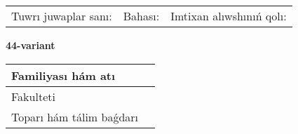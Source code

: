 \documentclass{article}
\begin{document}
\vspace{1cm}

\begin{tabular}{lll}
Tuwrı juwaplar sanı: \underline{\hspace{1.5cm}} & 
Bahası: \underline{\hspace{1.5cm}} & 
Imtixan alıwshınıń qolı: \underline{\hspace{2cm}} \\
\end{tabular}

\egroup

\newpage


\textbf{44-variant}\\

\bgroup
\def\arraystretch{1.6} %

\begin{tabular}{|m{5.7cm}|m{9.5cm}|}
\hline
Familiyası hám atı & \\
\hline
Fakulteti  & \\
\hline
Toparı hám tálim baǵdarı  & \\
\hline
\end{tabular}

\vspace{1cm}
\end{document}
